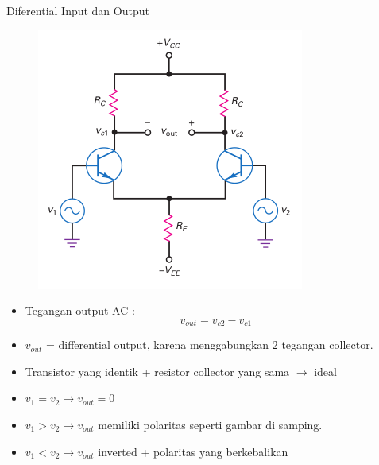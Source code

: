 \documentclass[aspectratio=169]{beamer}
\begin{document}
\begin{frame}{Diferential Input dan Output}
	\begin{multicols}{2}
		\begin{figure}
			\centering
			\includegraphics[height=0.7\textheight]{gambar/01.diff-amp/01.differential_input_output}
		\end{figure}
		\columnbreak
		\begin{itemize}
			\item Tegangan output AC :\\
			
			\begin{equation} \label{pers.1}
				v_{out} =  v_{c2} - v_{c1}
			\end{equation}
		
			\item $ v_{out} $ = differential output, karena menggabungkan 2 tegangan collector.
			\item Transistor yang identik + resistor collector yang sama $ \rightarrow $ ideal
			\item $ v_1 = v_2 \rightarrow v_{out} = 0 $
			\item $ v_1 > v_2 \rightarrow v_{out} $ memiliki polaritas seperti gambar di samping.
			\item $ v_1 < v_2 \rightarrow v_{out} $ inverted + polaritas yang berkebalikan
		\end{itemize}
	\end{multicols}
\end{frame}
\end{document}
